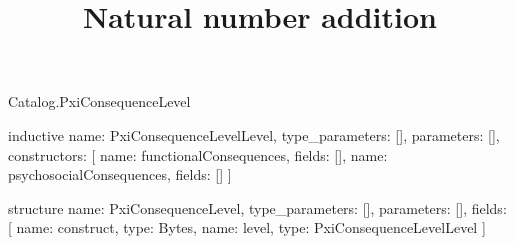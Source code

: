 \begin{lexlean}{Catalog.PxiConsequenceLevel}
\title{Natural number addition}
\begin{semanticmodule}
inductive{
  name: PxiConsequenceLevelLevel,
  type_parameters: [],
  parameters: [],
  constructors: [
    {name: functionalConsequences, fields: []},
    {name: psychosocialConsequences, fields: []}
  ]
}

structure{
  name: PxiConsequenceLevel,
  type_parameters: [],
  parameters: [],
  fields: [
    {name: construct, type: Bytes},
    {name: level, type: PxiConsequenceLevelLevel}
  ]
}
\end{semanticmodule}
\end{lexlean}
